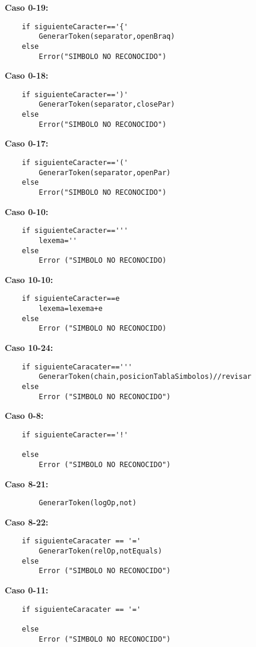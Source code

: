 \documentclass{article}
\begin{document}
\textbf{Caso 0-19:}
\begin{verbatim}
    if siguienteCaracter=='{'
        GenerarToken(separator,openBraq)
    else
        Error("SIMBOLO NO RECONOCIDO")
\end{verbatim}

\textbf{Caso 0-18:}
\begin{verbatim}
    if siguienteCaracter==')'
        GenerarToken(separator,closePar)
    else
        Error("SIMBOLO NO RECONOCIDO")  
\end{verbatim}

\textbf{Caso 0-17:}
\begin{verbatim}
    if siguienteCaracter=='('
        GenerarToken(separator,openPar)
    else
        Error("SIMBOLO NO RECONOCIDO")
\end{verbatim}
\newpage
\textbf{Caso 0-10:}
\begin{verbatim}
    if siguienteCaracter=='''
        lexema=''
    else
        Error ("SIMBOLO NO RECONOCIDO)
\end{verbatim}

\textbf{Caso 10-10:}
\begin{verbatim}
    if siguienteCaracter==e
        lexema=lexema+e
    else 
        Error ("SIMBOLO NO RECONOCIDO)
\end{verbatim}

\textbf{Caso 10-24:}
\begin{verbatim}
    if siguienteCaracater=='''
        GenerarToken(chain,posicionTablaSimbolos)//revisar
    else 
        Error ("SIMBOLO NO RECONOCIDO")
\end{verbatim}

\textbf{Caso 0-8:}
\begin{verbatim}
    if siguienteCaracter=='!'
    
    else 
        Error ("SIMBOLO NO RECONOCIDO")
\end{verbatim}

\textbf{Caso 8-21:}
\begin{verbatim}
        GenerarToken(logOp,not)
\end{verbatim}

\textbf{Caso 8-22:}
\begin{verbatim}
    if siguienteCaracater == '='
        GenerarToken(relOp,notEquals)
    else 
        Error ("SIMBOLO NO RECONOCIDO")  
\end{verbatim}

\textbf{Caso 0-11:}
\begin{verbatim}
    if siguienteCaracater == '='

    else 
        Error ("SIMBOLO NO RECONOCIDO")  
\end{verbatim}
\end{document}
